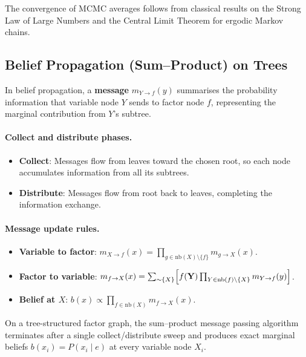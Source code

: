 The convergence of MCMC averages follows from classical results on the Strong Law of Large Numbers and the Central Limit Theorem for ergodic Markov chains.

\subsection{Belief Propagation (Sum--Product) on Trees}

In belief propagation, a \textbf{message} $m_{Y\to f}(y)$ summarises the
probability information that variable node $Y$ sends to factor node $f$,
representing the marginal contribution from $Y$'s subtree.

\paragraph{Collect and distribute phases.}
\begin{itemize}
\item \textbf{Collect}: Messages flow from leaves toward the chosen root,
      so each node accumulates information from all its subtrees.
\item \textbf{Distribute}: Messages flow from root back to leaves,
      completing the information exchange.
\end{itemize}

\paragraph{Message update rules.}
\begin{itemize}
\item \textbf{Variable to factor}:
$m_{X\to f}(x)=\prod_{g\in\mathrm{nb}(X)\setminus\{f\}} m_{g\to X}(x)$.
\item \textbf{Factor to variable}:
$m_{f\to X}(x)=\sum_{\sim\{X\}}\Bigl[f(\mathbf{Y})\prod_{Y\in\mathrm{nb}(f)\setminus\{X\}} m_{Y\to f}(y)\Bigr]$.
\item \textbf{Belief at $X$}:
$b(x)\propto\prod_{f\in\mathrm{nb}(X)} m_{f\to X}(x)$.
\end{itemize}

\begin{theorem}
On a tree-structured factor graph, the sum--product message passing algorithm
terminates after a single collect/distribute sweep and produces exact marginal
beliefs $b(x_i)=P(x_i\mid e)$ at every variable node $X_i$.
\end{theorem}


